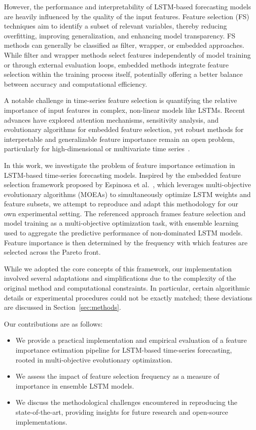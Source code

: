 \documentclass[12pt]{article}
\begin{document}
However, the performance and interpretability of LSTM-based forecasting models are heavily influenced by the quality of the input features. Feature selection (FS) techniques aim to identify a subset of relevant variables, thereby reducing overfitting, improving generalization, and enhancing model transparency. FS methods can generally be classified as filter, wrapper, or embedded approaches. ~\cite{espinosa2023efs} While filter and wrapper methods select features independently of model training or through external evaluation loops, embedded methods integrate feature selection within the training process itself, potentially offering a better balance between accuracy and computational efficiency.

A notable challenge in time-series feature selection is quantifying the relative importance of input features in complex, non-linear models like LSTMs. Recent advances have explored attention mechanisms, sensitivity analysis, and evolutionary algorithms for embedded feature selection, yet robust methods for interpretable and generalizable feature importance remain an open problem, particularly for high-dimensional or multivariate time series~\cite{espinosa2023efs}.

In this work, we investigate the problem of feature importance estimation in LSTM-based time-series forecasting models. Inspired by the embedded feature selection framework proposed by Espinosa et al.~\cite{espinosa2023efs}, which leverages multi-objective evolutionary algorithms (MOEAs) to simultaneously optimize LSTM weights and feature subsets, we attempt to reproduce and adapt this methodology for our own experimental setting. The referenced approach frames feature selection and model training as a multi-objective optimization task, with ensemble learning used to aggregate the predictive performance of non-dominated LSTM models. Feature importance is then determined by the frequency with which features are selected across the Pareto front.

While we adopted the core concepts of this framework, our implementation involved several adaptations and simplifications due to the complexity of the original method and computational constraints. In particular, certain algorithmic details or experimental procedures could not be exactly matched; these deviations are discussed in Section~\ref{sec:methods}.

Our contributions are as follows:
\begin{itemize}
    \item We provide a practical implementation and empirical evaluation of a feature importance estimation pipeline for LSTM-based time-series forecasting, rooted in multi-objective evolutionary optimization.
    \item We assess the impact of feature selection frequency as a measure of importance in ensemble LSTM models.
    \item We discuss the methodological challenges encountered in reproducing the state-of-the-art, providing insights for future research and open-source implementations.
\end{itemize}
\end{document}

